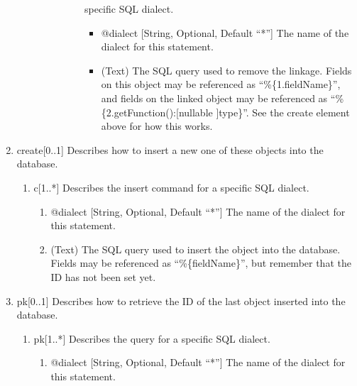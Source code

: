 \documentclass{book}
\begin{document}
\begin{enumerate}
\begin{enumerate}
\begin{enumerate}
\begin{enumerate}
\begin{itemize}
                          specific SQL dialect.
                    \begin{itemize}
                        \item @dialect [String, Optional, Default ``*''] The
                              name of the dialect for this statement.
                        \item (Text) The SQL query used to remove the linkage.
                              Fields on this object may be referenced as
                              ``\%\{1.fieldName\}'', and fields on the linked
                              object may be referenced as
                              ``\%\{2.getFunction():[nullable ]type\}''. See
                              the create element above for how this works.
                    \end{itemize}
                \end{itemize}
            \end{enumerate}
        \end{enumerate}
    \end{enumerate}
    \item create[0..1] Describes how to insert a new one of these objects into
          the database.
    \begin{enumerate}
        \item c[1..*] Describes the insert command for a specific SQL dialect.
        \begin{enumerate}
            \item @dialect [String, Optional, Default ``*''] The name of the
                  dialect for this statement.
            \item (Text) The SQL query used to insert the object into the
                  database. Fields may be referenced as ``\%\{fieldName\}'', but
                  remember that the ID has not been set yet.
        \end{enumerate}
    \end{enumerate}
    \item pk[0..1] Describes how to retrieve the ID of the last object inserted
          into the database.
    \begin{enumerate}
        \item pk[1..*] Describes the query for a specific SQL dialect.
        \begin{enumerate}
            \item @dialect [String, Optional, Default ``*''] The name of the
                  dialect for this statement.

\end{enumerate}
\end{enumerate}
\end{enumerate}
\end{document}
